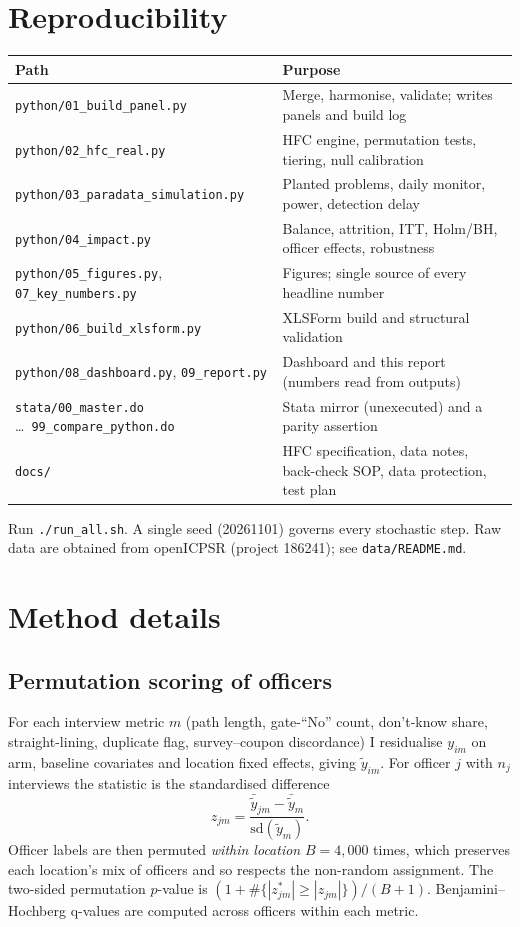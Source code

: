 \documentclass[11pt,a4paper]{article}
\begin{document}
\section{Reproducibility}
\begin{tabular}{p{4.2cm}p{10cm}}\toprule Path & Purpose\\\midrule
\texttt{python/01\_build\_panel.py} & Merge, harmonise, validate; writes panels and build log\\
\texttt{python/02\_hfc\_real.py} & HFC engine, permutation tests, tiering, null calibration\\
\texttt{python/03\_paradata\_simulation.py} & Planted problems, daily monitor, power, detection delay\\
\texttt{python/04\_impact.py} & Balance, attrition, ITT, Holm/BH, officer effects, robustness\\
\texttt{python/05\_figures.py}, \texttt{07\_key\_numbers.py} & Figures; single source of every headline number\\
\texttt{python/06\_build\_xlsform.py} & XLSForm build and structural validation\\
\texttt{python/08\_dashboard.py}, \texttt{09\_report.py} & Dashboard and this report (numbers read from outputs)\\
\texttt{stata/00\_master.do} \ldots\ \texttt{99\_compare\_python.do} & Stata mirror (unexecuted) and a parity assertion\\
\texttt{docs/} & HFC specification, data notes, back-check SOP, data protection, test plan\\\bottomrule\end{tabular}

Run \texttt{./run\_all.sh}. A single seed (20261101) governs every stochastic step. Raw data are obtained from openICPSR (project 186241); see \texttt{data/README.md}.

\section{Method details}\label{app:method}
\subsection{Permutation scoring of officers}
For each interview metric $m$ (path length, gate-``No'' count, don't-know share, straight-lining, duplicate flag, survey--coupon discordance) I residualise $y_{im}$ on arm, baseline covariates and location fixed effects, giving $\tilde y_{im}$. For officer $j$ with $n_j$ interviews the statistic is the standardised difference
\[ z_{jm}=\frac{\bar{\tilde y}_{jm}-\bar{\tilde y}_{m}}{\mathrm{sd}(\tilde y_m)} . \]
Officer labels are then permuted \emph{within location} $B=4{,}000$ times, which preserves each location's mix of officers and so respects the non-random assignment. The two-sided permutation $p$-value is $(1+\#\{|z^{*}_{jm}|\ge|z_{jm}|\})/(B+1)$. Benjamini--Hochberg q-values are computed across officers within each metric.
\end{document}

